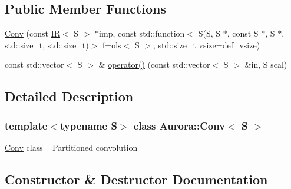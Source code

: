 \subsection*{Public Member Functions}
\begin{DoxyCompactItemize}
\item 
\hyperlink{class_aurora_1_1_conv_a083d9451fbf4739031ba9feaa530e382}{Conv} (const \hyperlink{class_aurora_1_1_i_r}{IR}$<$ S $>$ $\ast$imp, const std\+::function$<$ S(S, S $\ast$, const S $\ast$, S $\ast$, std\+::size\+\_\+t, std\+::size\+\_\+t)$>$ f=\hyperlink{namespace_aurora_a7ec189488ba66508d8df1c1670823365}{ols}$<$ S $>$, std\+::size\+\_\+t \hyperlink{class_aurora_1_1_snd_base_af9e21aaf411b17f7a8221c991ce5d291}{vsize}=\hyperlink{namespace_aurora_afaaddf667a06e7ce23c667a8b7295263}{def\+\_\+vsize})
\item 
const std\+::vector$<$ S $>$ \& \hyperlink{class_aurora_1_1_conv_aeefccb7a11338388723bb78e025ad030}{operator()} (const std\+::vector$<$ S $>$ \&in, S scal)
\end{DoxyCompactItemize}


\subsection{Detailed Description}
\subsubsection*{template$<$typename S$>$\newline
class Aurora\+::\+Conv$<$ S $>$}

\hyperlink{class_aurora_1_1_conv}{Conv} class ~\newline
Partitioned convolution 

\subsection{Constructor \& Destructor Documentation}
\mbox{\label{class_aurora_1_1_conv_a083d9451fbf4739031ba9feaa530e382}} 
